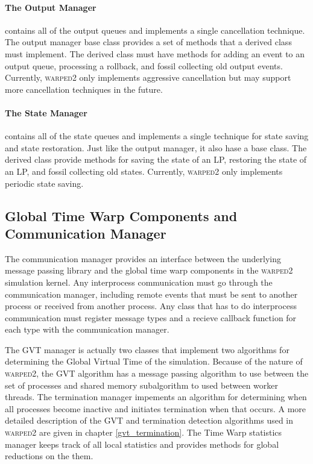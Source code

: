 \documentclass[11pt]{book}
\begin{document}
\paragraph{The Output Manager} contains all of the output queues and implements a single
cancellation technique. The output manager base class provides a set of methods that a derived
class must implement. The derived class must have methods for adding an event to an output queue,
processing a rollback, and fossil collecting old output events. Currently, \textsc{warped2} only
implements aggressive cancellation but may support more cancellation techniques in the future.

\paragraph{The State Manager} contains all of the state queues and implements a single technique
for state saving and state restoration. Just like the output manager, it also hase a base
class. The derived class provide methods for saving the state of an LP, restoring the state of
an LP, and fossil collecting old states. Currently, \textsc{warped2} only implements periodic
state saving.

\subsection{Global Time Warp Components and Communication Manager}

The communication manager provides an interface between the underlying message passing library
and the global time warp components in the \textsc{warped2} simulation kernel. Any interprocess
communication must go through the communication manager, including remote events that must be
sent to another process or received from another process. Any class that has to do interprocess
communication must register message types and a recieve callback function for each type with
the communication manager.

The GVT manager is actually two classes that implement two algorithms for determining the Global
Virtual Time of the simulation. Because of the nature of \textsc{warped2}, the GVT algorithm has
a message passing algorithm to use between the set of processes and shared memory subalgorithm
to used between worker threads. The termination manager impements an algorithm for determining
when all processes become inactive and initiates termination when that occurs. A more detailed
description of the GVT and termination detection algorithms used in \textsc{warped2} are given
in chapter \ref{gvt_termination}. The Time Warp statistics manager keeps track of all local
statistics and provides methods for global reductions on the them. 
\end{document}
